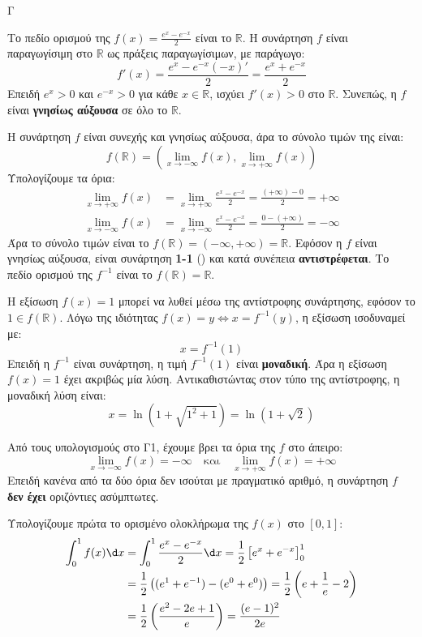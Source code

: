 \begin{thema}{Γ}
\begin{erwthma}
\item Το πεδίο ορισμού της $f(x) = \frac{e^x - e^{-x}}{2}$ είναι το $\mathbb{R}$.
Η συνάρτηση $f$ είναι παραγωγίσιμη στο $\mathbb{R}$ ως πράξεις παραγωγίσιμων, με παράγωγο:
\[ f'(x) = \frac{e^x - e^{-x}(-x)'}{2} = \frac{e^x + e^{-x}}{2} \]
Επειδή $e^x > 0$ και $e^{-x} > 0$ για κάθε $x \in \mathbb{R}$, ισχύει $f'(x) > 0$ στο $\mathbb{R}$.
Συνεπώς, η $f$ είναι \textbf{γνησίως αύξουσα} σε όλο το $\mathbb{R}$.

Η συνάρτηση $f$ είναι συνεχής και γνησίως αύξουσα, άρα το σύνολο τιμών της είναι:
\[ f(\mathbb{R}) = \left( \lim_{x \to -\infty} f(x), \lim_{x \to +\infty} f(x) \right) \]
Υπολογίζουμε τα όρια:
\begin{align*}
\lim_{x \to +\infty} f(x) &= \lim_{x \to +\infty} \frac{e^x - e^{-x}}{2} = \frac{(+\infty) - 0}{2} = +\infty \\
\lim_{x \to -\infty} f(x) &= \lim_{x \to -\infty} \frac{e^x - e^{-x}}{2} = \frac{0 - (+\infty)}{2} = -\infty
\end{align*}
Άρα το σύνολο τιμών είναι το $f(\mathbb{R}) = (-\infty, +\infty) = \mathbb{R}$.
Εφόσον η $f$ είναι γνησίως αύξουσα, είναι συνάρτηση \textbf{1-1} () και κατά συνέπεια \textbf{αντιστρέφεται}. Το πεδίο ορισμού της $f^{-1}$ είναι το $f(\mathbb{R}) = \mathbb{R}$.

\item Η εξίσωση $f(x) = 1$ μπορεί να λυθεί μέσω της αντίστροφης συνάρτησης, εφόσον το $1 \in f(\mathbb{R})$.
Λόγω της ιδιότητας $f(x) = y \Leftrightarrow x = f^{-1}(y)$, η εξίσωση ισοδυναμεί με:
\[ x = f^{-1}(1) \]
Επειδή η $f^{-1}$ είναι συνάρτηση, η τιμή $f^{-1}(1)$ είναι \textbf{μοναδική}. Άρα η εξίσωση $f(x) = 1$ έχει ακριβώς μία λύση.
Αντικαθιστώντας στον τύπο της αντίστροφης, η μοναδική λύση είναι:
\[ x = \ln(1 + \sqrt{1^2+1}) = \ln(1 + \sqrt{2}) \]

\item Από τους υπολογισμούς στο Γ1, έχουμε βρει τα όρια της $f$ στο άπειρο:
\[ \lim_{x \to -\infty} f(x) = -\infty \quad \text{και} \quad \lim_{x \to +\infty} f(x) = +\infty \]
Επειδή κανένα από τα δύο όρια δεν ισούται με πραγματικό αριθμό, η συνάρτηση $f$ \textbf{δεν έχει} οριζόντιες ασύμπτωτες.

\item Υπολογίζουμε πρώτα το ορισμένο ολοκλήρωμα της $f(x)$ στο $[0, 1]$:
\begin{align*}
\int_0^1 f(x) \d x &= \int_0^1 \frac{e^x - e^{-x}}{2} \d x = \frac{1}{2} \left[ e^x + e^{-x} \right]_0^1 \\
&= \frac{1}{2} \left( (e^1 + e^{-1}) - (e^0 + e^0) \right) = \frac{1}{2} \left( e + \frac{1}{e} - 2 \right) \\
&= \frac{1}{2} \left( \frac{e^2 - 2e + 1}{e} \right) = \frac{(e-1)^2}{2e}
\end{align*}


\end{erwthma}
\end{thema}
